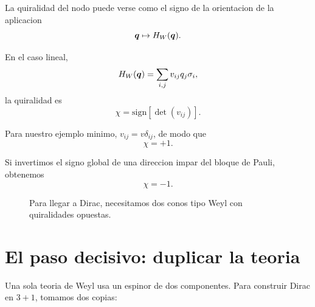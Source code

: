 La quiralidad del nodo puede verse como el signo de la orientacion de la aplicacion
\begin{equation}
\bm{q} \mapsto H_W(\bm{q}).
\end{equation}

En el caso lineal,
\begin{equation}
H_W(\bm{q})=\sum_{i,j} v_{ij} q_j \sigma_i,
\end{equation}
la quiralidad es
\begin{equation}
\chi = \mathrm{sign}\!\left[\det(v_{ij})\right].
\label{c07:eq:chirality}
\end{equation}

Para nuestro ejemplo minimo, \(v_{ij}=v\delta_{ij}\), de modo que
\begin{equation}
\chi = +1.
\end{equation}

Si invertimos el signo global de una direccion impar del bloque de Pauli, obtenemos
\begin{equation}
\chi=-1.
\end{equation}

\begin{figure}[ht]
\centering
{}
\caption{Para llegar a Dirac, necesitamos dos conos tipo Weyl con quiralidades opuestas.}
\label{c07:fig:two-chiralities}
\end{figure}

\section{El paso decisivo: duplicar la teoria}

Una sola teoria de Weyl usa un espinor de dos componentes. Para construir Dirac en \(3+1\), tomamos dos copias:

